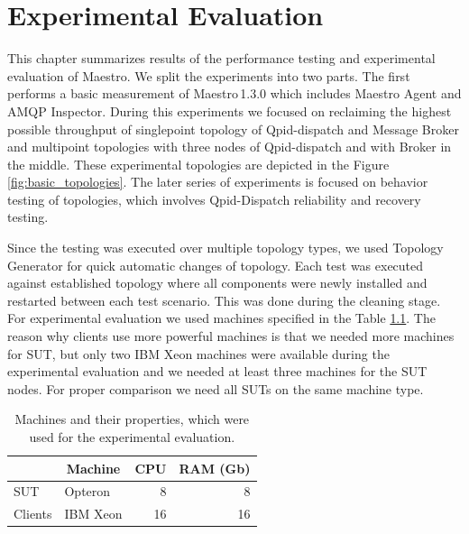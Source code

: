 
\chapter{Experimental Evaluation}
\label{Experimental Evaluation}
This chapter summarizes results of the performance testing and experimental evaluation of Maestro. We split the experiments into two parts. The first performs a basic measurement of Maestro\,1.3.0 which includes Maestro Agent and AMQP Inspector. During this experiments we focused on reclaiming the highest possible throughput of singlepoint topology of Qpid-dispatch and Message Broker and multipoint topologies with three nodes of Qpid-dispatch and with Broker in the middle. These experimental topologies are depicted in the Figure \ref{fig:basic_topologies}. The later series of experiments is focused on behavior testing of topologies, which involves Qpid-Dispatch reliability and recovery testing.

Since the testing was executed over multiple topology types, we used Topology Generator for quick automatic changes of topology. Each test was executed against established topology where all components were newly installed and restarted between each test scenario. This was done during the cleaning stage. For experimental evaluation we used machines specified in the Table \ref{tab:machines}. The reason why clients use more powerful machines is that we needed more machines for SUT, but only two IBM Xeon machines were available during the experimental evaluation and we needed at least three machines for the SUT nodes. For proper comparison we need all SUTs on the same machine type.

\begin{table}[H]
\centering
\caption{Machines and their properties, which were used for the experimental evaluation.}
\label{tab:machines}
\begin{tabular}{|l|l|r|r|}
\hline
\rowcolor[HTML]{C5E3DF}
\textbf{} & \multicolumn{1}{c|}{\cellcolor[HTML]{C5E3DF}\textbf{Machine}} & \multicolumn{1}{c|}{\cellcolor[HTML]{C5E3DF}\textbf{CPU}} & \multicolumn{1}{c|}{\cellcolor[HTML]{C5E3DF}\textbf{RAM (Gb)}} \\ \hline
SUT       & Opteron                                                       & 8                                                         & 8                                                      \\ \hline
Clients   & IBM Xeon                                                      & 16                                                        & 16                                                     \\ \hline
\end{tabular}
\end{table}

